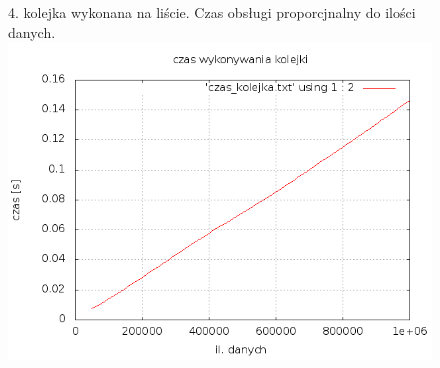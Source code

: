 \documentclass[a4paper,11pt]{report}
\begin{document}
\begin{figure}
  \begin{center}
  4. kolejka wykonana na liście. Czas obsługi proporcjnalny do ilości danych.
    \includegraphics[scale=0.5]{./czas_kolejka.png}
    \label{fig:}
    \caption{}
  \end{center}
\end{figure}
\end{document}
